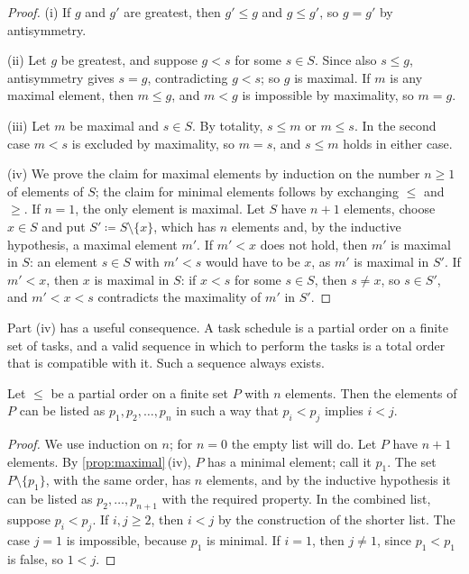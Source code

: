 \begin{proof}
(i) If $g$ and $g'$ are greatest, then $g'\le g$ and $g\le g'$, so $g=g'$ by antisymmetry.

(ii) Let $g$ be greatest, and suppose $g<s$ for some $s\in S$. Since also $s\le g$, antisymmetry gives $s=g$, contradicting $g<s$; so $g$ is maximal. If $m$ is any maximal element, then $m\le g$, and $m<g$ is impossible by maximality, so $m=g$.

(iii) Let $m$ be maximal and $s\in S$. By totality, $s\le m$ or $m\le s$. In the second case $m<s$ is excluded by maximality, so $m=s$, and $s\le m$ holds in either case.

(iv) We prove the claim for maximal elements by induction on the number $n\ge1$ of elements of $S$; the claim for minimal elements follows by exchanging $\le$ and $\ge$. If $n=1$, the only element is maximal. Let $S$ have $n+1$ elements, choose $x\in S$ and put $S'\coloneqq S\setminus\{x\}$, which has $n$ elements and, by the inductive hypothesis, a maximal element $m'$. If $m'<x$ does not hold, then $m'$ is maximal in $S$: an element $s\in S$ with $m'<s$ would have to be $x$, as $m'$ is maximal in $S'$. If $m'<x$, then $x$ is maximal in $S$: if $x<s$ for some $s\in S$, then $s\ne x$, so $s\in S'$, and $m'<x<s$ contradicts the maximality of $m'$ in $S'$.
\end{proof}

Part (iv) has a useful consequence. A task schedule is a partial order on a finite set of tasks, and a valid sequence in which to perform the tasks is a total order that is compatible with it. Such a sequence always exists.

\begin{theorem}
\label{thm:linear-extension}
Let $\le$ be a partial order on a finite set $P$ with $n$ elements. Then the elements of $P$ can be listed as $p_1,p_2,\ldots,p_n$ in such a way that $p_i<p_j$ implies $i<j$.
\end{theorem}

\begin{proof}
We use induction on $n$; for $n=0$ the empty list will do. Let $P$ have $n+1$ elements. By \cref{prop:maximal}\,(iv), $P$ has a minimal element; call it $p_1$. The set $P\setminus\{p_1\}$, with the same order, has $n$ elements, and by the inductive hypothesis it can be listed as $p_2,\ldots,p_{n+1}$ with the required property. In the combined list, suppose $p_i<p_j$. If $i,j\ge2$, then $i<j$ by the construction of the shorter list. The case $j=1$ is impossible, because $p_1$ is minimal. If $i=1$, then $j\ne1$, since $p_1<p_1$ is false, so $1<j$.
\end{proof}


